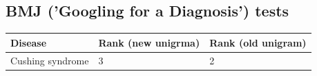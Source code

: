 \documentclass[10pt,letterpaper,final]{article}
\begin{document}
\subsection{BMJ ('Googling for a Diagnosis') tests }
\label{app:bmj_old_new}
\begin{center}
\begin{small}
	\begin{tabular}{|p{6cm}|p{2.5cm}|p{2.5cm}|}
	\hline
	\textbf{Disease} & \textbf{Rank (new unigrma)} & \textbf{Rank (old unigram)} \\
    \hline\hline
    Cushing syndrome & 3 & 2 \\    \hline

\end{tabular}
\end{small}
\end{center}
\end{document}
